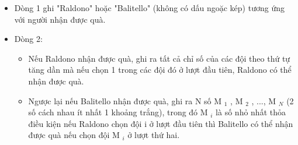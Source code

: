 \begin{itemize}
	\item Dòng 1 ghi "Raldono" hoặc "Balitello" (không có dấu ngoặc kép) tương ứng với người nhận được quà.
	\item Dòng 2:
\begin{itemize}
	\item Nếu Raldono nhận được quà, ghi ra tất cả chỉ số của các đội theo thứ tự tăng dần mà nếu chọn 1 trong các đội đó ở lượt đầu tiên, Raldono có thể nhận được quà.
	\item Ngược lại nếu Balitello nhận được quà, ghi ra N số M $_ 1 $ , M $_ 2 $ , ..., M $_ N $ (2 số cách nhau ít nhất 1 khoảng trắng), trong đó M $_ i $ là số nhỏ nhất thỏa điều kiện nếu Raldono chọn đội i ở lượt đầu tiên thì Balitello có thể nhận được quà nếu chọn đội M $_ i $ ở lượt thứ hai.
\end{itemize}
\end{itemize}
